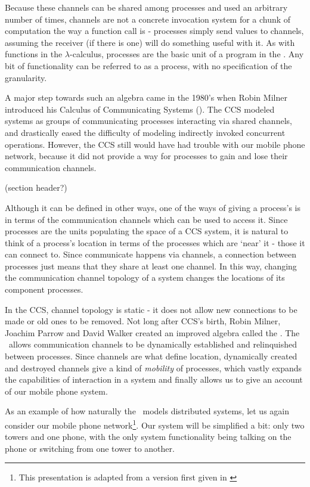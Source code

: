 Because these channels can be shared among processes and used an arbitrary number of times, channels are not a concrete invocation system for a chunk of computation the way a function call is - processes simply send values to channels, assuming the receiver (if there is one) will do something useful with it.  
As with functions in the $\lambda$-calculus, processes are the basic unit of a program in the \picalc. 
Any bit of functionality can be referred to as a process, with no specification of the granularity.

A major step towards such an algebra came in the 1980's when Robin Milner introduced his Calculus of Communicating Systems (\!).  
 The CCS modeled systems as groups of communicating processes interacting via shared channels, and drastically eased the difficulty of modeling indirectly invoked concurrent operations.  
However, the CCS still would have had trouble with our mobile phone network, because it did not provide a way for processes to gain and lose their communication channels.

(section header?)

	Although it can be defined in other ways, one of the ways of giving a process's\emph{} is in terms of the communication channels which can be used to access it.  
Since processes are the units populating the space of a CCS system, it is natural to think of a process's location in terms of the processes which are `near' it - those it can connect to.  
Since communicate happens via channels, a connection between processes just means that they share at least one channel.  
In this way, changing the communication channel topology of a system changes the locations of its component processes.  

	
	In the CCS, channel topology is static - it does not allow new connections to be made or old ones to be removed.  
Not long after CCS's birth, Robin Milner, Joachim Parrow and David Walker created an improved algebra called the \inidx{\picalc}.  
The \picalc\ allows communication channels to be dynamically established and relinquished between processes.  
Since channels are what define location, dynamically created and destroyed channels give a kind of \emph{mobility} of processes, which vastly expands the capabilities of interaction in a system and finally allows us to give an account of our mobile phone system.
	
	As an example of how naturally the \picalc\ models distributed systems, let us again consider our mobile phone network\footnote{This presentation is adapted from a version first given in \cite{miln99}}.  
Our system will be simplified a bit: only two towers and one phone, with the only system functionality being talking on the phone or switching from one tower to another.
	

